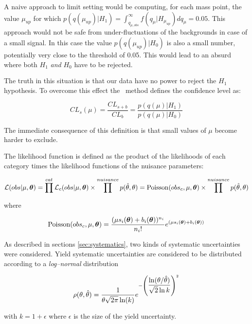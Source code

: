 A naive approach to limit setting would be computing, for each mass point, the value $\mu_{up}$ for which $p(q(\mu_{up}) | H_1) = \int_{q_{\mu,obs}}^{\infty}f(q_\mu|H_{\mu_{up}})dq_\mu = 0.05$. This approach would not be safe from under-fluctuations of the backgrounds in case of a small signal. In this case the value $p(q(\mu_{up}) | H_0)$ is also a small number, potentially very close to the threshold of 0.05. This would lead to an absurd where both $H_1$ \emph{and} $H_0$ have to be rejected.

The truth in this situation is that our data have no power to reject the $H_1$ hypothesis. To overcome this effect the \CLs\ method defines the confidence level as:

\begin{equation}
CL_s(\mu) = \dfrac{CL_{s+b}}{CL_b} = \dfrac{p(q(\mu) | H_1)}{p(q(\mu) | H_0)}
\end{equation}

The immediate consequence of this definition is that small values of $\mu$ become harder to exclude.

The likelihood function is defined as the product of the likelihoods of each category times the likelihood functions of the nuisance parameters:

\begin{equation}
\mathcal{L}(obs|\mu, \boldsymbol\theta) = \prod^{cat} \mathcal{L}_c(obs|\mu, \boldsymbol\theta) \times \prod^{nuisance} p(\hat{\theta},\theta) = \operatorname{Poisson}(obs_c, \mu, \boldsymbol\theta) \times \prod^{nuisance} p(\hat{\theta},\theta)
\end{equation}

where

\begin{equation}
\operatorname{Poisson}(obs_c, \mu, \boldsymbol\theta) = \dfrac{(\mu s_i(\boldsymbol\theta) + b_i(\boldsymbol\theta))^{n_i}}{n_i!}e^{(\mu s_i(\boldsymbol\theta) + b_i(\boldsymbol\theta))}
\end{equation}

As described in sections \ref{sec:systematics}, two kinds of systematic uncertainties were considered. Yield systematic uncertainties are considered to be distributed according to a \emph{log--normal} distribution 

\begin{equation}
\rho(\theta, \hat{\theta}) = \dfrac{1}{\theta\sqrt{2\pi}\operatorname{ln}(k)} e^{-\left(\dfrac{\operatorname{ln}(\theta/\hat{\theta})}{\sqrt{2}\operatorname{ln}k}\right)^2}
\end{equation}

with $k = 1+ \epsilon$ where $\epsilon$ is the size of the yield uncertainty.

